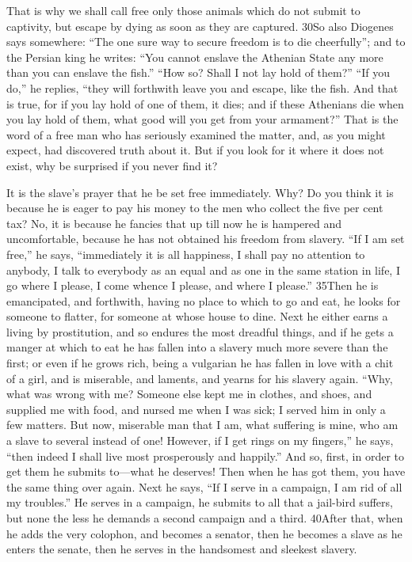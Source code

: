 That is why we shall call free only those animals which do not submit to captivity, but escape by dying as soon as they are captured. 30So also Diogenes says somewhere: ``The one sure way to secure freedom is to die cheerfully''; and to the Persian king he writes: ``You cannot enslave the Athenian State any more than you can enslave the fish.'' ``How so? Shall I not lay hold of them?'' ``If you do,'' he replies, ``they will forthwith leave you and escape, like the fish. And that is true, for if you lay hold of one of them, it dies; and if these Athenians die when you lay hold of them, what good will you get from your armament?'' That is the word of a free man who has seriously examined the matter, and, as you might expect, had discovered truth about it. But if you look for it where it does not exist, why be surprised if you never find it?

It is the slave's prayer that he be set free immediately. Why? Do you think it is because he is eager to pay his money to the men who collect the five per cent tax? No, it is because he fancies that up till now he is hampered and uncomfortable, because he has not obtained his freedom from slavery. ``If I am set free,'' he says, ``immediately it is all happiness, I shall pay no attention to anybody, I talk to everybody as an equal and as one in the same station in life, I go where I please, I come whence I please, and where I please.'' 35Then he is emancipated, and forthwith, having no place to which to go and eat, he looks for someone to flatter, for someone at whose house to dine. Next he either earns a living by prostitution, and so endures the most dreadful things, and if he gets a manger at which to eat he has fallen into a slavery much more severe than the first; or even if he grows rich, being a vulgarian he has fallen in love with a chit of a girl, and is miserable, and laments, and yearns for his slavery again. ``Why, what was wrong with me? Someone else kept me in clothes, and shoes, and supplied me with food, and nursed me when I was sick; I served him in only a few matters. But now, miserable man that I am, what suffering is mine, who am a slave to several instead of one! However, if I get rings on my fingers,'' he says, ``then indeed I shall live most prosperously and happily.'' And so, first, in order to get them he submits to—what he deserves! Then when he has got them, you have the same thing over again. Next he says, ``If I serve in a campaign, I am rid of all my troubles.'' He serves in a campaign, he submits to all that a jail-bird suffers, but none the less he demands a second campaign and a third. 40After that, when he adds the very colophon, and becomes a senator, then he becomes a slave as he enters the senate, then he serves in the handsomest and sleekest slavery.

